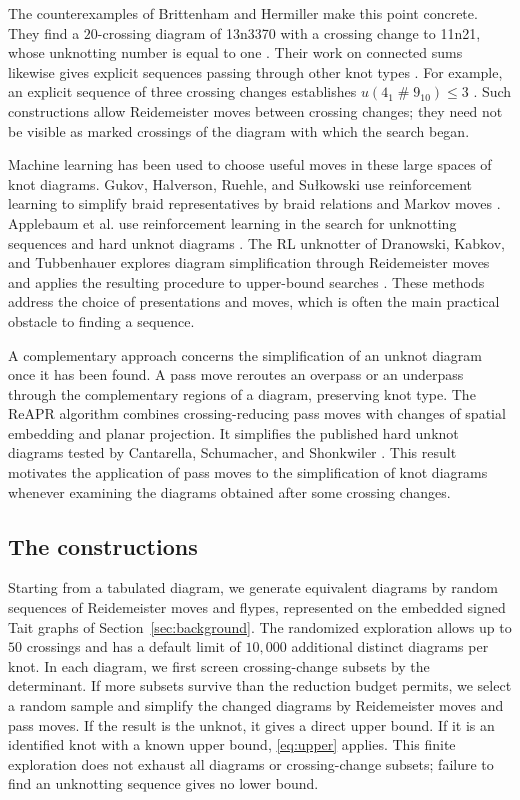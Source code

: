 \documentclass[12pt, oneside]{amsart}
\newcommand{\kn}[2]{\textup{#1#2}}
\begin{document}
The counterexamples of Brittenham and Hermiller make this point concrete. They find a $20$-crossing diagram of \kn{13n}{3370} with a
crossing change to \kn{11n}{21}, whose unknotting number is equal to one \cite{BH1705}.
Their work on connected sums likewise gives explicit sequences passing through other knot
types \cite{BHadd,BH26}. For example, an explicit sequence of three crossing changes establishes
$u(4_1\mathbin{\#}9_{10})\le3$ \cite[Thm.~1.1]{BH26}. Such constructions allow
Reidemeister moves between crossing changes; they need not be visible as marked crossings
of the diagram with which the search began.

Machine learning has been used to choose useful moves in these large spaces of knot diagrams.
Gukov, Halverson, Ruehle, and Su{\l}kowski use reinforcement learning to simplify braid
representatives by braid relations and Markov moves \cite{GukovUnknot}. Applebaum et al.
use reinforcement learning in the search for unknotting sequences and hard unknot
diagrams \cite{Applebaum}. The RL unknotter of Dranowski, Kabkov, and Tubbenhauer
explores diagram simplification through Reidemeister moves and applies the resulting
procedure to upper-bound searches \cite{DKT}. These methods address the choice of
presentations and moves, which is often the main practical obstacle to finding a sequence.

A complementary approach concerns the simplification of an unknot diagram once it has
been found. A pass move reroutes an overpass or an underpass through the complementary
regions of a diagram, preserving knot type. The ReAPR algorithm combines crossing-reducing
pass moves with changes of spatial embedding and planar projection. It simplifies the
published hard unknot diagrams tested by Cantarella, Schumacher, and Shonkwiler
\cite{ReAPR}. This result motivates the application of pass moves to the simplification of knot diagrams whenever examining the diagrams obtained after some crossing changes.

\subsection{The constructions}\label{sec:construction}

Starting from a tabulated diagram, we generate equivalent diagrams by random
sequences of Reidemeister moves and flypes, represented on the
embedded signed Tait graphs of Section~\ref{sec:background}. The randomized
exploration allows up to $50$ crossings and has a default limit of $10{,}000$
additional distinct diagrams per knot. In each diagram, we first screen
crossing-change subsets by the determinant. If more subsets survive than the
reduction budget permits, we select a random sample and simplify the changed
diagrams by Reidemeister moves and pass moves. If the result is the unknot,
it gives a direct upper bound. If it is an identified knot with a known upper
bound, \eqref{eq:upper} applies. This finite exploration does not exhaust all diagrams
or crossing-change subsets; failure to find an unknotting sequence gives no
lower bound.
\end{document}
